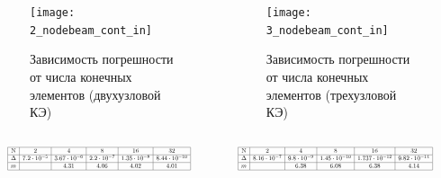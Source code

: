 \documentclass[7pt]{beamer}
\numberwithin{equation}{section}
\newcommand*{\Scale}[2][4]{\scalebox{#1}{$#2$}}
\begin{document}
\begin{frame}{}
	\begin{columns}
		\begin{column}{0.57\textwidth}
			\begin{figure}[H]
				\centering
				\texttt{[image: 2\_nodebeam\_cont\_in]}
				\caption{Зависимость погрешности от числа конечных элементов (двухузловой КЭ)}
				\label{fig:2_nodebeam_cont_in}
			\end{figure}
		\end{column}
		\begin{column}{0.57\textwidth}
			\begin{figure}[H]
				\centering
				\texttt{[image: 3\_nodebeam\_cont\_in]}
				\caption{Зависимость погрешности от числа конечных элементов (трехузловой КЭ)}
				\label{fig:3_nodebeam_cont_in}
			\end{figure}
		\end{column}
	\end{columns}
	\begin{columns}
		\begin{column}{0.5\textwidth}
			\[
				\Scale[0.5] {
						\begin{array}{|c|c|c|c|c|c|}
								\hline
								\text{N} & 2 & 4 & 8 & 16 & 32 \\ \hline
								\Delta  & 7.2 \cdot 10^{-5} & 3.67 \cdot 10^{-6} & 2.2 \cdot 10^{-7} & 1.35 \cdot 10^{-8} & 8.44 \cdot 10^{-10}\\ \hline
								m  &  & 4.31 & 4.06 & 4.02 & 4.01 \\ 
								\hline
						\end{array}
				}
			\]
		\end{column}
		\begin{column}{0.5\textwidth}
			\[
				\Scale[0.5] {
					\begin{array}{|c|c|c|c|c|c|}
						\hline
						\text{N} & 2 & 4 & 8 & 16 & 32\\ \hline
						\Delta  & 8.16 \cdot 10^{-7} & 9.8 \cdot 10^{-9} & 1.45 \cdot 10^{-10} & 1.737 \cdot 10^{-12} & 9.82 \cdot 10^{-14}\\ \hline
						m &  & 6.38 & 6.08 & 6.38 & 4.14 \\ 
						\hline
					\end{array}
				}
			\]
		\end{column}
	\end{columns}
\end{frame}
\end{document}
